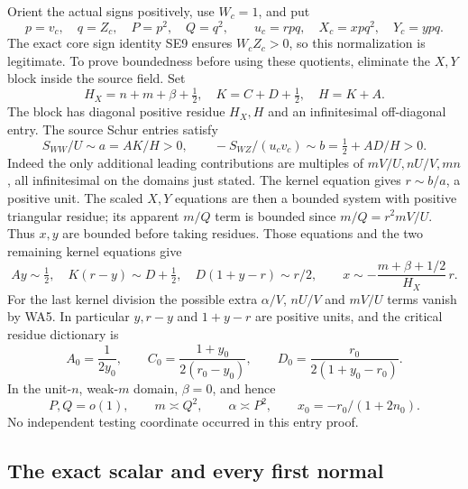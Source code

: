 Orient the actual signs positively, use \(W_c=1\), and put
\[
 p=v_c,\quad q=Z_c,\quad P=p^2,\quad Q=q^2,\qquad
 u_c=rpq,\quad X_c=xpq^2,\quad Y_c=ypq.
 \tag{WA7}
\]
The exact core sign identity SE9 ensures \(W_cZ_c>0\), so this
normalization is legitimate. To prove boundedness before using these
quotients, eliminate the \(X,Y\) block inside the source field. Set
\[
 H_X=n+m+\beta+\tfrac12,\quad K=C+D+\tfrac12,\quad H=K+A .
\]
The block has diagonal positive residue \(H_X,H\) and an infinitesimal
off-diagonal entry. The source Schur entries satisfy
\[
 S_{WW}/U\sim a=AK/H>0,\qquad
 -S_{WZ}/(u_cv_c)\sim b=\tfrac12+AD/H>0.
 \tag{WA8}
\]
Indeed the only additional leading contributions are multiples of
\(mV/U,nU/V,mn\), all infinitesimal on the domains just stated.
The kernel equation gives \(r\sim b/a\), a positive unit. The scaled
\(X,Y\) equations are then a bounded system with positive triangular
residue; its apparent \(m/Q\) term is bounded since
\(m/Q=r^2mV/U\). Thus \(x,y\) are bounded before taking residues.
Those equations and the two remaining kernel equations give
\[
 Ay\sim\tfrac12,\quad
 K(r-y)\sim D+\tfrac12,\quad
 D(1+y-r)\sim r/2,\qquad
 x\sim-\frac{m+\beta+1/2}{H_X}\,r.
 \tag{WA9}
\]
For the last kernel division the possible extra \(\alpha/V\),
\(nU/V\) and \(mV/U\) terms vanish by WA5. In particular \(y,r-y\)
and \(1+y-r\) are positive units, and the critical residue dictionary is
\[
 A_0=\frac1{2y_0},\qquad
 C_0=\frac{1+y_0}{2(r_0-y_0)},\qquad
 D_0=\frac{r_0}{2(1+y_0-r_0)}.
 \tag{WA10}
\]
In the unit-\(n\), weak-\(m\) domain, \(\beta=0\), and hence
\[
 P,Q=o(1),\qquad m\asymp Q^2,\qquad
 \alpha\asymp P^2,\qquad
 x_0=-r_0/(1+2n_0).
 \tag{WA11}
\]
No independent testing coordinate occurred in this entry proof.

\subsection{The exact scalar and every first normal}

